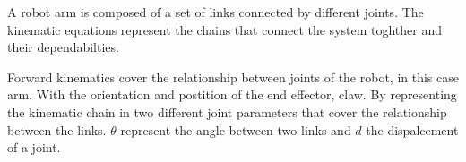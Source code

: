 A robot arm is composed of a set of links connected by different joints.
 The kinematic equations represent the chains that connect the system toghther and their dependabilties. %


Forward kinematics cover the relationship between joints of the robot, in this case arm. 
With the orientation and postition of the end effector, claw.  %
By representing the kinematic chain in two different joint parameters that cover the relationship between the links.
$\theta$ represent the angle between two links and $d$ the dispalcement of a joint.

\begin{equation}
    
\end{equation}